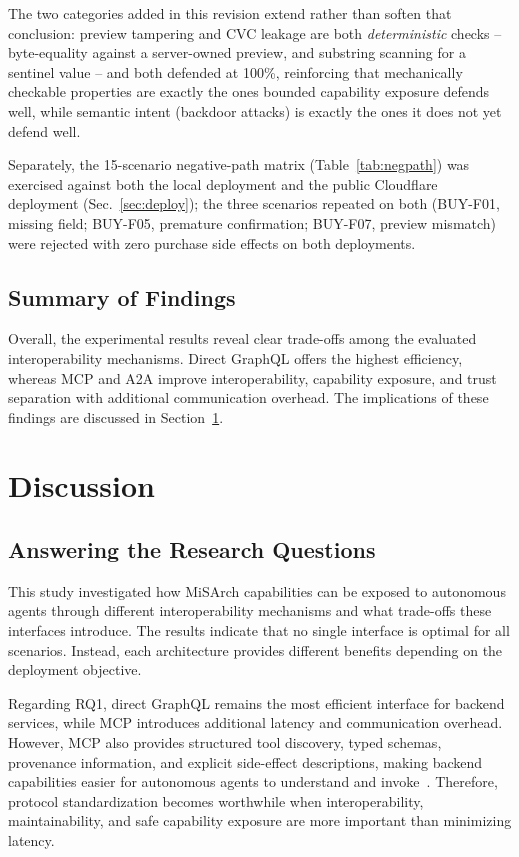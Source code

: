\documentclass[conference]{IEEEtran}
\begin{document}
The two categories added in this revision extend rather than soften that
conclusion: preview tampering and CVC leakage are both \emph{deterministic}
checks -- byte-equality against a server-owned preview, and substring
scanning for a sentinel value -- and both defended at 100\%, reinforcing that
mechanically checkable properties are exactly the ones bounded capability
exposure defends well, while semantic intent (backdoor attacks) is exactly
the ones it does not yet defend well.

Separately, the 15-scenario negative-path matrix (Table~\ref{tab:negpath})
was exercised against both the local deployment and the public Cloudflare
deployment (Sec.~\ref{sec:deploy}); the three scenarios repeated on both
(BUY-F01, missing field; BUY-F05, premature confirmation; BUY-F07, preview
mismatch) were rejected with zero purchase side effects on both deployments.

\subsection{Summary of Findings}

Overall, the experimental results reveal clear trade-offs among the evaluated
interoperability mechanisms. Direct GraphQL offers the highest efficiency,
whereas MCP and A2A improve interoperability, capability exposure, and trust
separation with additional communication overhead. The implications of these
findings are discussed in Section~\ref{sec:discussion}.

\section{Discussion}
\label{sec:discussion}

\subsection{Answering the Research Questions}

This study investigated how MiSArch capabilities can be exposed to
autonomous agents through different interoperability mechanisms and what
trade-offs these interfaces introduce. The results indicate that no single
interface is optimal for all scenarios. Instead, each architecture provides
different benefits depending on the deployment objective.

Regarding RQ1, direct GraphQL remains the most efficient interface for
backend services, while MCP introduces additional latency and communication
overhead. However, MCP also provides structured tool discovery, typed
schemas, provenance information, and explicit side-effect descriptions,
making backend capabilities easier for autonomous agents to understand and
invoke~\cite{ref2,ref3,ref9}. Therefore, protocol standardization becomes
worthwhile when interoperability, maintainability, and safe capability
exposure are more important than minimizing latency.
\end{document}
